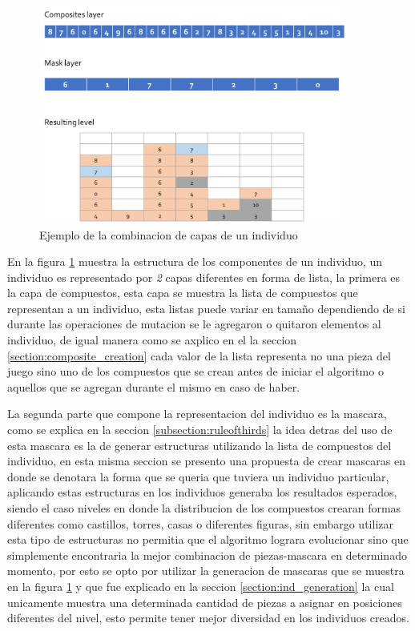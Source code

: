 \begin{figure}
  \centering
  \includegraphics[width=0.9\textwidth]{img/layer12_combine.png}
  \caption{Ejemplo de la combinacion de capas de un individuo}
  \label{figure:individual_representation}
\end{figure}

En la figura \ref{figure:individual_representation} muestra la estructura de los
componentes de un individuo, un individuo es representado por \textit{2} capas
diferentes en forma de lista, la primera es la capa de compuestos, esta capa se
muestra la lista de compuestos que representan a un individuo, esta listas puede
variar en tamaño dependiendo de si durante las operaciones de mutacion se le
agregaron o quitaron elementos al individuo, de igual manera como se axplico en
el la seccion \ref{section:composite_creation} cada valor de la lista representa
no una pieza del juego sino uno de los compuestos que se crean antes de iniciar
el algoritmo o aquellos que se agregan durante el mismo en caso de haber.

La segunda parte que compone la representacion del individuo es la mascara, como
se explica en la seccion \ref{subsection:ruleofthirds} la idea detras del uso de
esta mascara es la de generar estructuras utilizando la lista de compuestos del
individuo, en esta misma seccion se presento una propuesta de crear mascaras en
donde se denotara la forma que se queria que tuviera un individuo particular,
aplicando estas estructuras en los individuos generaba los resultados esperados,
siendo el caso niveles en donde la distribucion de los compuestos crearan formas
diferentes como castillos, torres, casas o diferentes figuras, sin embargo
utilizar esta tipo de estructuras no permitia que el algoritmo lograra
evolucionar sino que simplemente encontraria la mejor combinacion de
piezas-mascara en determinado momento, por esto se opto por utilizar la
generacion de mascaras que se muestra en la figura
\ref{figure:individual_representation} y que fue explicado en la seccion
\ref{section:ind_generation} la cual unicamente muestra una determinada cantidad
de piezas a asignar en posiciones diferentes del nivel, esto permite tener mejor
diversidad en los individuos creados.

